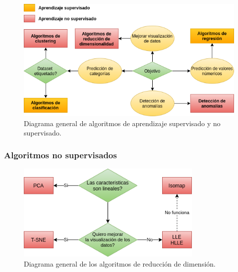 \documentclass[a4paper,12pt]{article}
\begin{document}
\begin{figure}[H]
	\begin{center}				
	\includegraphics[width=1\textwidth]{maindiagram.png}
  	\caption{Diagrama general de algoritmos de aprendizaje supervisado y no supervisado.}
  	\label{fig:maindiagram.}
  	\end{center}
\end{figure}

\subsubsection{Algoritmos no supervisados}

\begin{figure}[H]
	\begin{center}				
	\includegraphics[width=0.8\textwidth]{dimreduxdiagram.png}
  	\caption{Diagrama general de los algoritmos de reducción de dimensión.}
  	\label{fig:dimreduxdiagram.}
  	\end{center}
\end{figure}
\end{document}
